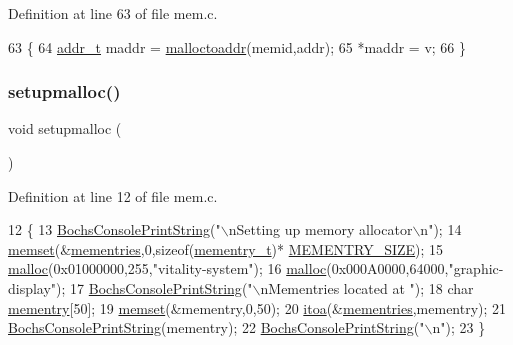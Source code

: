 Definition at line 63 of file mem.\+c.


\begin{DoxyCode}
63                                                        \{
64     \hyperlink{a00095_a295f71165288684c38c6bb836fbb3c59_a295f71165288684c38c6bb836fbb3c59}{addr\_t} maddr = \hyperlink{a00107_ae024364045572d15f9b90b8a046d6807_ae024364045572d15f9b90b8a046d6807}{malloctoaddr}(memid,addr);
65     *maddr = v;
66 \}
\end{DoxyCode}
\mbox{\label{a00107_a1add491f9ef2f8830ed5108f8dbc0ff2_a1add491f9ef2f8830ed5108f8dbc0ff2}} 
\subsubsection{\texorpdfstring{setupmalloc()}{setupmalloc()}}
{\footnotesize\ttfamily void setupmalloc (\begin{DoxyParamCaption}{ }\end{DoxyParamCaption})}



Definition at line 12 of file mem.\+c.


\begin{DoxyCode}
12                    \{
13     \hyperlink{a00041_a19e1f554d03c977f8b947f21489daa41_a19e1f554d03c977f8b947f21489daa41}{BochsConsolePrintString}(\textcolor{stringliteral}{"\(\backslash\)nSetting up memory allocator\(\backslash\)n"});
14     \hyperlink{a00089_a9e432f267691eceb2e2e0efcc37efbc9_a9e432f267691eceb2e2e0efcc37efbc9}{memset}(&\hyperlink{a00107_a9ec3d7a60bca9bd965aba15905c6d1ed_a9ec3d7a60bca9bd965aba15905c6d1ed}{mementries},0,\textcolor{keyword}{sizeof}(\hyperlink{a00164}{mementry\_t})*
      \hyperlink{a00107_a48623ea6ed429e2f046b49041dde1dc5_a48623ea6ed429e2f046b49041dde1dc5}{MEMENTRY\_SIZE});
15     \hyperlink{a00107_a9087e3504e5973deee6f3561705978c7_a9087e3504e5973deee6f3561705978c7}{malloc}(0x01000000,255,\textcolor{stringliteral}{"vitality-system"});
16     \hyperlink{a00107_a9087e3504e5973deee6f3561705978c7_a9087e3504e5973deee6f3561705978c7}{malloc}(0x000A0000,64000,\textcolor{stringliteral}{"graphic-display"});
17     \hyperlink{a00041_a19e1f554d03c977f8b947f21489daa41_a19e1f554d03c977f8b947f21489daa41}{BochsConsolePrintString}(\textcolor{stringliteral}{"\(\backslash\)nMementries located at "});
18     \textcolor{keywordtype}{char} \hyperlink{a00164}{mementry}[50];
19     \hyperlink{a00089_a9e432f267691eceb2e2e0efcc37efbc9_a9e432f267691eceb2e2e0efcc37efbc9}{memset}(&mementry,0,50);
20     \hyperlink{a00083_af749add1ff19b6ff96a62f35ebb49b7e_af749add1ff19b6ff96a62f35ebb49b7e}{itoa}(&\hyperlink{a00107_a9ec3d7a60bca9bd965aba15905c6d1ed_a9ec3d7a60bca9bd965aba15905c6d1ed}{mementries},mementry);
21     \hyperlink{a00041_a19e1f554d03c977f8b947f21489daa41_a19e1f554d03c977f8b947f21489daa41}{BochsConsolePrintString}(mementry);
22     \hyperlink{a00041_a19e1f554d03c977f8b947f21489daa41_a19e1f554d03c977f8b947f21489daa41}{BochsConsolePrintString}(\textcolor{stringliteral}{"\(\backslash\)n"});
23 \}
\end{DoxyCode}


